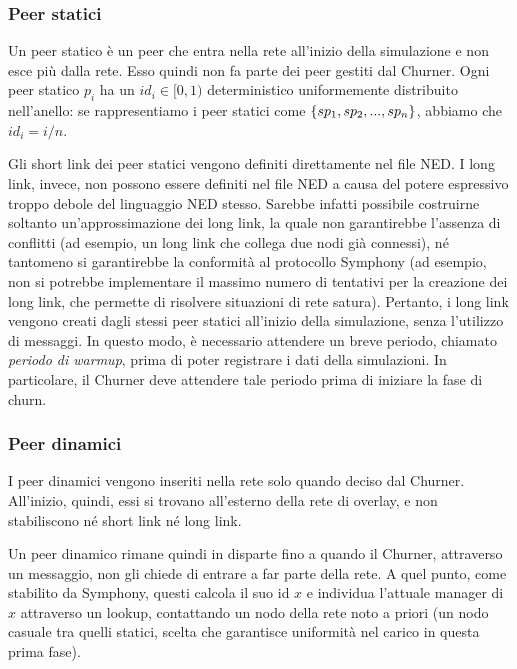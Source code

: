 \documentclass[prodmode,acmtap]{acmlarge}
\begin{document}
\subsubsection*{Peer statici}
Un peer statico è un peer che entra nella rete all'inizio della simulazione e non esce più dalla rete. Esso quindi non fa parte dei peer gestiti dal Churner. Ogni peer statico $p_i$ ha un $id_i \in [0,1)$ deterministico uniformemente distribuito nell'anello: se rappresentiamo i peer statici come $\{sp_1, \linebreak[1] sp_2, \linebreak[1] ..., \linebreak[1] sp_n\}$, abbiamo che $id_i = i / n$.

Gli short link dei peer statici vengono definiti direttamente nel file NED. I long link, invece, non possono essere definiti nel file NED a causa del potere espressivo troppo debole del linguaggio NED stesso. Sarebbe infatti possibile costruirne soltanto un'approssimazione dei long link, la quale non garantirebbe l'assenza di conflitti (ad esempio, un long link che collega due nodi già connessi), né tantomeno si garantirebbe la conformità al protocollo Symphony (ad esempio, non si potrebbe implementare il massimo numero di tentativi per la creazione dei long link, che permette di risolvere situazioni di rete satura). Pertanto, i long link vengono creati dagli stessi peer statici all'inizio della simulazione, senza l'utilizzo di messaggi. In questo modo, è necessario attendere un breve periodo, chiamato \textit{periodo di warmup}, prima di poter registrare i dati della simulazioni. In particolare, il Churner deve attendere tale periodo prima di iniziare la fase di churn.

\subsubsection*{Peer dinamici}
I peer dinamici vengono inseriti nella rete solo quando deciso dal Churner. All'inizio, quindi, essi si trovano all'esterno della rete di overlay, e non stabiliscono né short link né long link.

Un peer dinamico rimane quindi in disparte fino a quando il Churner, attraverso un messaggio, non gli chiede di entrare a far parte della rete. A quel punto, come stabilito da Symphony, questi calcola il suo id $x$ e individua l'attuale manager di $x$ attraverso un lookup, contattando un nodo della rete noto a priori (un nodo casuale tra quelli statici, scelta che garantisce uniformità nel carico in questa prima fase).
\end{document}
